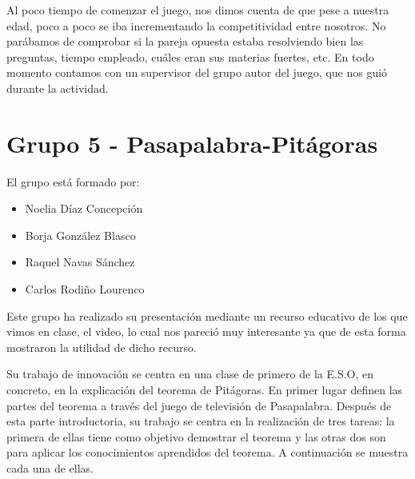 Al poco tiempo de comenzar el juego, nos dimos cuenta de que pese a nuestra edad, poco a poco se iba incrementando la competitividad entre nosotros. No parábamos de comprobar si la pareja opuesta estaba resolviendo bien las preguntas, tiempo empleado, cuáles eran sus materias fuertes, etc. En todo momento contamos con un supervisor del grupo autor del juego, que nos guió durante la actividad.



\section*{Grupo 5 - Pasapalabra-Pitágoras}

El grupo está formado por:

\begin{itemize}
\item Noelia Díaz Concepción
\item Borja González Blasco
\item Raquel Navas Sánchez
\item Carlos Rodiño Lourenco
\end{itemize}

Este grupo ha realizado su presentación mediante un recurso educativo de los que vimos en clase, el video, lo cual nos pareció muy interesante ya que de esta forma mostraron la utilidad de dicho recurso. 

Su trabajo de innovación se centra en una clase de primero de la E.S.O, en concreto, en la explicación del teorema de Pitágoras. En primer lugar definen las partes del teorema a través del juego de televisión de Pasapalabra. Después de esta parte introductoria, su trabajo se centra en la realización de tres tareas: la primera de ellas tiene como objetivo demostrar el teorema y las otras dos son para aplicar los conocimientos aprendidos del teorema. A continuación se muestra cada una de ellas.


